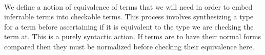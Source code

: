 \begin{code}
\\[\AgdaEmptyExtraSkip]%
\>[0]\AgdaSpace{}%
\AgdaSymbol{:}%
\>[142I]\AgdaSpace{}%
%
\>[42]\<%
\\
\>[.][@{}l@{}]\<[142I]%
\>[13]%
\>[44]\<%
\\
%
\>[13]\AgdaSpace{}%
%
\>[42]\<%
\\
%
\>[13]\AgdaSymbol{(}\AgdaSpace{}%
\AgdaSymbol{:}\AgdaSpace{}%
\AgdaSpace{}%
\AgdaSpace{}%
\AgdaSymbol{)}%
\>[42]\<%
\\
%
\>[13]\AgdaSymbol{(}\AgdaSpace{}%
\AgdaSymbol{:}\AgdaSpace{}%
\AgdaSpace{}%
\AgdaSpace{}%
\AgdaSymbol{)}%
\>[42]\<%
\\
%
\>[13]\AgdaSpace{}%
\AgdaSymbol{(}\AgdaSpace{}%
\AgdaSpace{}%
\AgdaSymbol{)}\<%
\end{code}

We define a notion of equivalence of terms that we will need in order
to embed inferrable terms into checkable terms. This process involves
synthesizing a type for a term before ascertaining if it is equivalent
to the type we are checking the term at. This is a purely syntactic action.
If terms are to have their normal forms compared then they must be
normalized before checking their equivalence here.

